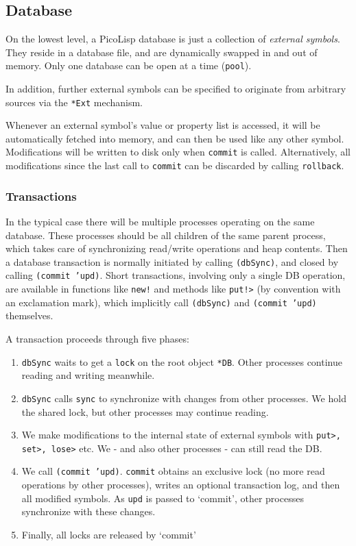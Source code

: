  

 
\subsection{Database}
\label{sec:refm-database}


On the lowest level, a PicoLisp database is just a collection of
\emph{external symbols}. They reside in a database file, and are
dynamically swapped in and out of memory. Only one database can be open
at a time (\texttt{pool}).

In addition, further external symbols can be specified to originate from
arbitrary sources via the \texttt{*Ext} mechanism.

Whenever an external symbol's value or property list is accessed, it
will be automatically fetched into memory, and can then be used like any
other symbol. Modifications will be written to disk only when \texttt{commit}
is called. Alternatively, all modifications since the last call to
\texttt{commit} can be discarded by calling \texttt{rollback}.

\subsubsection{Transactions}
\label{sec:refm-transactions}%
In the typical case there will be multiple processes operating on the
same database. These processes should be all children of the same parent
process, which takes care of synchronizing read/write operations and
heap contents. Then a database transaction is normally initiated by
calling \texttt{(dbSync)}, and closed by calling \texttt{(commit 'upd)}. Short
transactions, involving only a single DB operation, are available in
functions like \texttt{new!} and methods like \texttt{put!>} (by convention with an
exclamation mark), which implicitly call \texttt{(dbSync)} and \texttt{(commit 'upd)}
themselves.

A transaction proceeds through five phases:

\begin{enumerate}
\item \texttt{dbSync} waits to get a \texttt{lock} on the root object \texttt{*DB}. Other
   processes continue reading and writing meanwhile.
\item \texttt{dbSync} calls \texttt{sync} to synchronize with changes from other
   processes. We hold the shared lock, but other processes may continue
   reading.
\item We make modifications to the internal state of external symbols with
   \texttt{put>, set>, lose>} etc. We - and also other processes - can still
   read the DB.
\item We call \texttt{(commit 'upd)}. \texttt{commit} obtains an exclusive lock (no more
   read operations by other processes), writes an optional transaction
   log, and then all modified symbols. As \texttt{upd} is passed to `commit',
   other processes synchronize with these changes.
\item Finally, all locks are released by `commit'
\end{enumerate}


